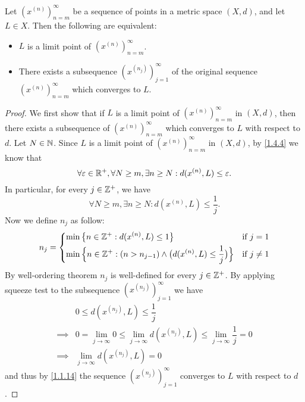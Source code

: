 \begin{prop}\label{1.4.5}
  Let \((x^{(n)})_{n = m}^\infty\) be a sequence of points in a metric space \((X, d)\), and let \(L \in X\).
  Then the following are equivalent:
  \begin{itemize}
    \item \(L\) is a limit point of \((x^{(n)})_{n = m}^\infty\).
    \item There exists a subsequence \((x^{(n_j)})_{j = 1}^\infty\) of the original sequence \((x^{(n)})_{n = m}^\infty\) which converges to \(L\).
  \end{itemize}
\end{prop}

\begin{proof}
  We first show that if \(L\) is a limit point of \((x^{(n)})_{n = m}^\infty\) in \((X, d)\), then there exists a subsequence of \((x^{(n)})_{n = m}^\infty\) which converges to \(L\) with respect to \(d\).
  Let \(N \in \mathbb{N}\).
  Since \(L\) is a limit point of \((x^{(n)})_{n = m}^\infty\) in \((X, d)\), by \cref{1.4.4} we know that
  \[
    \forall \varepsilon \in \mathbb{R}^+, \forall N \geq m, \exists n \geq N : d(x^{(n)}, L) \leq \varepsilon.
  \]
  In particular, for every \(j \in \mathbb{Z}^+\), we have
  \[
    \forall N \geq m, \exists n \geq N : d(x^{(n)}, L) \leq \dfrac{1}{j}.
  \]
  Now we define \(n_j\) as follow:
  \[
    n_j = \begin{dcases}
      \min\big\{n \in \mathbb{Z}^+ : d(x^{(n)}, L) \leq 1\big\}                                            & \text{if } j = 1    \\
      \min\Big\{n \in \mathbb{Z}^+ : (n > n_{j - 1}) \land \big(d(x^{(n)}, L) \leq \dfrac{1}{j}\big)\Big\} & \text{if } j \neq 1
    \end{dcases}
  \]
  By well-ordering theorem \(n_j\) is well-defined for every \(j \in \mathbb{Z}^+\).
  By applying squeeze test to the subsequence \((x^{(n_j)})_{j = 1}^\infty\) we have
  \begin{align*}
             & 0 \leq d(x^{(n_j)}, L) \leq \dfrac{1}{j}                                                                     \\
    \implies & 0 = \lim_{j \to \infty} 0 \leq \lim_{j \to \infty} d(x^{(n_j)}, L) \leq \lim_{j \to \infty} \dfrac{1}{j} = 0 \\
    \implies & \lim_{j \to \infty} d(x^{(n_j)}, L) = 0
  \end{align*}
  and thus by \cref{1.1.14} the sequence \((x^{(n_j)})_{j = 1}^\infty\) converges to \(L\) with respect to \(d\).


\end{proof}

